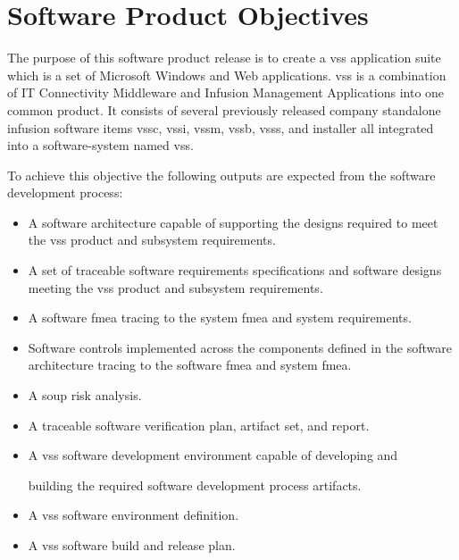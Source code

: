 \section{Software Product Objectives}
The purpose of this software product release is to create a \gls{vss} application
suite which is a set of Microsoft Windows and Web applications. \gls{vss} is a
combination of IT Connectivity Middleware and Infusion Management Applications
into one common product. It consists of several previously released
\gls{company} standalone infusion software items \gls{vssc}, \gls{vssi},
\gls{vssm}, \gls{vssb}, \gls{vsss}, and \gls{installer} all integrated into a
\gls{software-system} named \gls{vss}.

\tlcVspace

To achieve this objective the following outputs are expected from the software
development process:
\begin{itemize}
  \item A software architecture capable of supporting the designs required to
    meet the \gls{vss} product and subsystem requirements.

  \item A set of traceable software requirements specifications and software
    designs meeting the \gls{vss} product and subsystem requirements.

  \item A software \Gls{fmea} tracing to the system \Gls{fmea} and system
    requirements.

  \item Software controls implemented across the components defined in the
    software architecture tracing to the software \Gls{fmea} and system
    \Gls{fmea}.

  \item A \gls{soup} risk analysis.

  \item A traceable software verification plan, artifact set, and report.

  \item A \gls{vss} software development environment capable of developing and

    building the required software development process artifacts.

  \item A \gls{vss} software environment definition.

  \item A \gls{vss} software \gls{build} and release plan.
\end{itemize}

